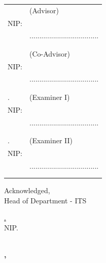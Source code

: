 \noindent
\begin{tabularx}{\textwidth}{X l}
  \advisor{}               & (Advisor)                         \\
  NIP: \advisornip{}       &                                     \\
                           & ................................... \\
                           &                                     \\
                           &                                     \\
  \coadvisor{}             & (Co-Advisor)                     \\
  NIP: \coadvisornip{}     &                                     \\
                           & ................................... \\
                           &                                     \\
                           &                                     \\
  \examinerone{}.          & (Examiner I)                        \\
  NIP: \examineronenip{}   &                                     \\
                           & ................................... \\
                           &                                     \\
                           &                                     \\
  \examinertwo{}.          & (Examiner II)                       \\
  NIP: \examinertwonip{}   &                                     \\
                           & ................................... \\
                           &                                     \\
                           &                                     \\

\end{tabularx}
\endgroup


\begin{center}
  Acknowledged, \\
  Head of \engdepartment{} Department \engfacultyshort{} - ITS \\

  \vspace{8ex}

  \underline{\headofdepartment{}.} \\
  NIP. \headofdepartmentnip{}
\end{center}

\begin{center}
  \textbf{\MakeUppercase{\place{}}\\\ENGMONTH{}, \the\year{}}
\end{center}
\endgroup
